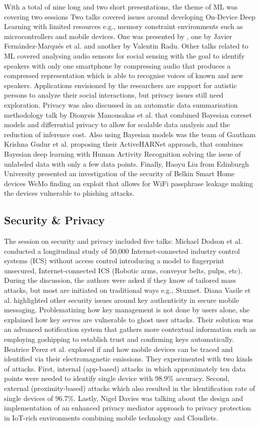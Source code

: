 \documentclass[conference]{IEEEtran}
\begin{document}
With a total of nine long and two short presentations, the theme of ML was covering two sessions Two talks covered issues around developing On-Device Deep Learning with limited resources e.g., memory constraint environments such as microcontrollers and mobile devices. One was presented by , one by Javier Fernández-Marqués et al. and another by Valentin Radu. 
Other talks related to ML covered analysing audio sensors for social sensing with the goal to identify speakers with only one smartphone by compressing audio that produces a compressed representation which is able to recognise voices of known and new speakers. Applications envisioned by the researchers are  support for autistic persons to analyze their social interactions, but privacy issues still need exploration. 
Privacy was also discussed in an automatic data summarisation methodology talk by Dionysis Manousakas et al. that combined Bayesian coreset models and differential privacy to allow for scalable data analysis and the reduction of inference cost. Also using Bayesian models was the team of Gautham Krishna Gudur et al. proposing their ActiveHARNet approach, that combines Bayesian deep learning with Human Activity Recognition solving the issue of unlabeled data with only a few data points. 
Finally, Haoyu Liu from Edinburgh University presented an investigation of the security of Belkin Smart Home devices WeMo finding an exploit that allows for WiFi passphrase leakage making the devices vulnerable to phishing attacks. 


\subsection{Security \& Privacy}

The session on security and privacy included five talks: Michael Dodson et al. conducted a longitudinal study  of 50,000 Internet-connected industry control systems (ICS) without access control introducing a model to fingerprint unsecured, Internet-connected ICS (Robotic arms, conveyor belts, pulps, etc). During the discussion, the authors were asked if they know of tailored mass attacks, but most are initiated on traditional ways e.g., Stuxnet. 
Diana Vasile et al. highlighted other security issues around key authenticity in secure mobile messaging. Problematizing how key management is not done by users alone, she explained how key serves are vulnerable to ghost user attacks. Their solution was an advanced notification system that gathers more contextual information such as employing goshipping to establish trust and confirming keys automatically. 
Beatrice Perez et al. explored if and how mobile devices can be traced and identified via their electromagnetic emissions. They experimented with two kinds of attacks. First, internal (app-based) attacks in which approximately ten data points were needed to identify single device with 98.9\% accuracy. Second, external (proximity-based) attacks which also resulted in the identification rate of single devices of 96.7\%.
Lastly, Nigel Davies was talking about the design and implementation of an enhanced privacy mediator approach to privacy protection in IoT-rich environments combining mobile technology and Cloudlets. 
\end{document}
